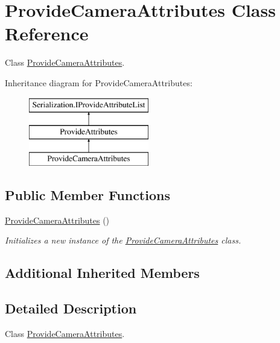 \hypertarget{class_provide_camera_attributes}{}\section{Provide\+Camera\+Attributes Class Reference}
\label{class_provide_camera_attributes}


Class \hyperlink{class_provide_camera_attributes}{Provide\+Camera\+Attributes}.  


Inheritance diagram for Provide\+Camera\+Attributes\+:\begin{figure}[H]
\begin{center}
\leavevmode
\includegraphics[height=3.000000cm]{class_provide_camera_attributes}
\end{center}
\end{figure}
\subsection*{Public Member Functions}
\begin{DoxyCompactItemize}
\item 
\hyperlink{class_provide_camera_attributes_a4813f670349ffbfc7c99dda6ab4b8cb1}{Provide\+Camera\+Attributes} ()
\begin{DoxyCompactList}\small\item\em Initializes a new instance of the \hyperlink{class_provide_camera_attributes}{Provide\+Camera\+Attributes} class. \end{DoxyCompactList}\end{DoxyCompactItemize}
\subsection*{Additional Inherited Members}


\subsection{Detailed Description}
Class \hyperlink{class_provide_camera_attributes}{Provide\+Camera\+Attributes}. 



